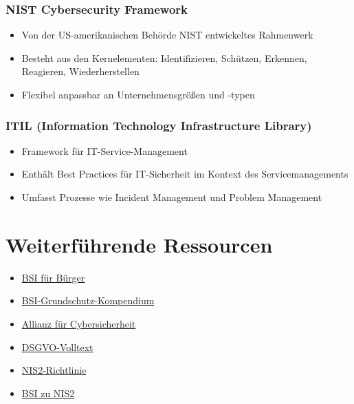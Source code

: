 \documentclass{orgstandard}
\begin{document}
\subsubsection{NIST Cybersecurity Framework}
\label{sec:org1708341}
\begin{itemize}
\item Von der US-amerikanischen Behörde NIST entwickeltes Rahmenwerk
\item Besteht aus den Kernelementen: Identifizieren, Schützen, Erkennen, Reagieren, Wiederherstellen
\item Flexibel anpassbar an Unternehmensgrößen und -typen
\end{itemize}
\subsubsection{ITIL (Information Technology Infrastructure Library)}
\label{sec:orgc6c443f}
\begin{itemize}
\item Framework für IT-Service-Management
\item Enthält Best Practices für IT-Sicherheit im Kontext des Servicemanagements
\item Umfasst Prozesse wie Incident Management und Problem Management
\end{itemize}
\section{Weiterführende Ressourcen}
\label{sec:org249c031}
\begin{itemize}
\item \href{https://www.bsi-fuer-buerger.de}{BSI für Bürger}
\item \href{https://www.bsi.bund.de/DE/Themen/Unternehmen-und-Organisationen/Standards-und-Zertifizierung/IT-Grundschutz/IT-Grundschutz-Kompendium/it-grundschutz-kompendium\_node.html}{BSI-Grundschutz-Kompendium}
\item \href{https://www.allianz-fuer-cybersicherheit.de}{Allianz für Cybersicherheit}
\item \href{https://dsgvo-gesetz.de}{DSGVO-Volltext}
\item \href{https://eur-lex.europa.eu/legal-content/DE/TXT/HTML/?uri=CELEX:32022L2555}{NIS2-Richtlinie}
\item \href{https://www.bsi.bund.de/DE/Themen/Regulierte-Wirtschaft/NIS-2-regulierte-Unternehmen/nis-2-regulierte-unternehmen\_node.html}{BSI zu NIS2}
\end{itemize}
\end{document}

